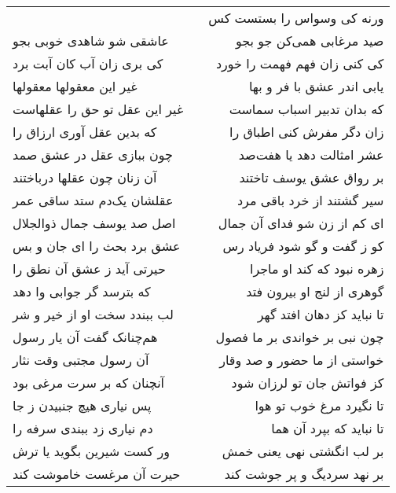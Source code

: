 \begin{center}
\begin{longtable}{l p{0.5cm} r}
&&
ورنه کی وسواس را بستست کس
\\
عاشقی شو شاهدی خوبی بجو
&&
صید مرغابی همی‌کن جو بجو
\\
کی بری زان آب کان آبت برد
&&
کی کنی زان فهم فهمت را خورد
\\
غیر این معقولها معقولها
&&
یابی اندر عشق با فر و بها
\\
غیر این عقل تو حق را عقلهاست
&&
که بدان تدبیر اسباب سماست
\\
که بدین عقل آوری ارزاق را
&&
زان دگر مفرش کنی اطباق را
\\
چون ببازی عقل در عشق صمد
&&
عشر امثالت دهد یا هفت‌صد
\\
آن زنان چون عقلها درباختند
&&
بر رواق عشق یوسف تاختند
\\
عقلشان یک‌دم ستد ساقی عمر
&&
سیر گشتند از خرد باقی مرد
\\
اصل صد یوسف جمال ذوالجلال
&&
ای کم از زن شو فدای آن جمال
\\
عشق برد بحث را ای جان و بس
&&
کو ز گفت و گو شود فریاد رس
\\
حیرتی آید ز عشق آن نطق را
&&
زهره نبود که کند او ماجرا
\\
که بترسد گر جوابی وا دهد
&&
گوهری از لنج او بیرون فتد
\\
لب ببندد سخت او از خیر و شر
&&
تا نباید کز دهان افتد گهر
\\
هم‌چنانک گفت آن یار رسول
&&
چون نبی بر خواندی بر ما فصول
\\
آن رسول مجتبی وقت نثار
&&
خواستی از ما حضور و صد وقار
\\
آنچنان که بر سرت مرغی بود
&&
کز فواتش جان تو لرزان شود
\\
پس نیاری هیچ جنبیدن ز جا
&&
تا نگیرد مرغ خوب تو هوا
\\
دم نیاری زد ببندی سرفه را
&&
تا نباید که بپرد آن هما
\\
ور کست شیرین بگوید یا ترش
&&
بر لب انگشتی نهی یعنی خمش
\\
حیرت آن مرغست خاموشت کند
&&
بر نهد سردیگ و پر جوشت کند
\\
\end{longtable}
\end{center}

